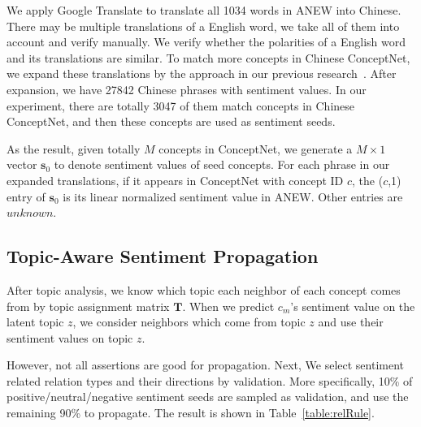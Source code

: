 We apply Google Translate to translate all 1034 words in ANEW into Chinese. There may be multiple translations of a English word, we take all of them into account and verify manually. We verify whether the polarities of a English word and its translations are similar. To match more concepts in Chinese ConceptNet, we expand these translations by the approach in our previous research~\cite{Wu:TAAI11}. After expansion, we have 27842 Chinese phrases with sentiment values. In our experiment, there are totally 3047 of them match concepts in Chinese ConceptNet, and then these concepts are used as sentiment seeds.

As the result, given totally $M$ concepts in ConceptNet, we generate a $M \times 1$ vector $\boldsymbol{s}_0$ to denote sentiment values of seed concepts. For each phrase in our expanded translations, if it appears in ConceptNet with concept ID $c$, the ($c$,1) entry of $\boldsymbol{s}_0$ is its linear normalized sentiment value in ANEW. Other entries are $unknown$.

\subsection{Topic-Aware Sentiment Propagation}
After topic analysis, we know which topic each neighbor of each concept comes from by topic assignment matrix $\boldsymbol{T}$. When we predict $c_m$'s sentiment value on the latent topic $z$, we consider neighbors which come from topic $z$ and use their sentiment values on topic $z$. 

However, not all assertions are good for propagation. Next, We select sentiment related relation types and their directions by validation. More specifically, 10\% of positive/neutral/negative sentiment seeds are sampled as validation, and use the remaining 90\% to propagate. The result is shown in Table~\ref{table:relRule}.

